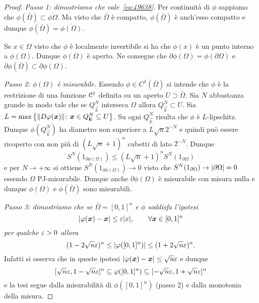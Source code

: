\begin{proof}
\emph{Passo 1: dimostriamo che vale~\eqref{eq:49638}}.
Per continuità di $\phi$ sappiamo che 
$\phi(\bar \Omega) \subset \overline{\phi \Omega}$.
Ma visto che $\bar \Omega$ è compatto, $\phi(\bar \Omega)$ 
è anch'esso compatto e dunque $\phi(\bar \Omega) = \overline{\phi(\Omega)}$.

Se $x\in \Omega$ visto che $\phi$ è localmente invertibile 
si ha che $\phi(x)$ è un punto interno a $\phi(\Omega)$.
Dunque $\phi(\Omega)$ è aperto.
Ne consegue che $\partial \phi(\Omega) = \phi(\partial \Omega)$
e $\partial \phi(\bar \Omega) \subset \partial \phi(\Omega)$.

\emph{Passo 2: $\phi(\Omega)$ è misurabile.}
Essendo $\phi\in C^1(\bar \Omega)$ si intende che $\phi$ è la restrizione 
di una funzione $\mathcal C^1$ definita su un aperto $U\supset \bar \Omega$.
Sia $N$ abbastanza grande in modo tale che se $Q^N_{\vec k}$ interseca 
$\Omega$ allora $Q^N_{\vec k}\subset U$. 
Sia $L = \max{\left\{ {\left\Vert D\varphi(\boldsymbol x)\right\Vert}\colon \boldsymbol x \in Q^N_{\boldsymbol k}\subseteq U  \right\}}$.
Su ogni $Q^N_{\vec k}$ risulta che $\phi$ è $L$-lipschitz.
Dunque $\phi(Q^N_{\vec k})$ ha diametro non superiore a 
$L \sqrt n 2^{-N}$ e quindi può essere ricoperto con non più di 
$(L\sqrt n + 1)^n$ cubetti di lato $2^{-N}$.
Dunque
\[
  S^N(1_{\partial \phi(\Omega)}) 
  \le (L\sqrt n +1)^n S^N(1_{\partial \Omega})
\]
e per $N\to +\infty$ si ottiene $S^N(1_{\partial \phi(\Omega)})\to 0$
visto che $S^N(1_{\partial \Omega})\to {\left|\partial \Omega\right|} = 0$ 
essendo $\Omega$ PJ-misurabile. 
Dunque anche $\partial\phi(\Omega)$ è misurabile con misura nulla 
e dunque $\phi(\Omega)$ e $\phi(\bar \Omega)$ sono misurabili.

\emph{Passo 3: dimostriamo che se $\bar \Omega=[0,1]^n$ e $\phi$ soddisfa
l'ipotesi
\[
  {\left|\varphi(\boldsymbol x)-\boldsymbol x\right|} \le \varepsilon{\left|x\right|}, \qquad \forall \boldsymbol x \in [0,1]^n
\]
per qualche $\varepsilon>0$ allora 
\[
  (1-2\sqrt{n}\varepsilon)^n \le {\left|\varphi([0,1]^n)\right|} \le (1+2\sqrt{n}\varepsilon)^n.
\]
}
Infatti si osserva che in queste ipotesi ${\left|\varphi(\boldsymbol x)-\boldsymbol x\right|}\le \sqrt n \varepsilon$
e dunque
\[
  [\sqrt n \varepsilon,1-\sqrt n \varepsilon]^n \subseteq \varphi([0,1]^n) \subseteq [-\sqrt n \varepsilon,1+\sqrt n \varepsilon]^n
\]
e la tesi segue dalla misurabilità di $\phi([0,1]^n)$ (passo 2)
e dalla monotonia della misura.


\end{proof}

